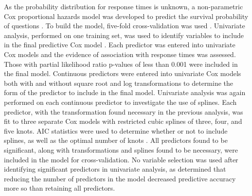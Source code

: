 \documentclass[preprint]{elsarticle}
\begin{document}
As the probability distribution for response times is unknown, a non-parametric Cox proportional hazards model was developed to predict the survival probability of questions \cite{Moore2010}. To build the model, five-fold cross-validation was used \cite{Rodriguez2010}. Univariate analysis, performed on one training set, was used to identify variables to include in the final predictive Cox model \cite{Hammermeister1979}. Each predictor was entered into univariate Cox models and the evidence of association with response times was assessed. Those with partial likelihood ratio p-values of less than 0.001 were included in the final model.  Continuous predictors were entered into univariate Cox models both with and without square root and log transformations to determine the form of the predictor to include in the final model. Univariate analysis was again performed on each continuous predictor to investigate the use of splines. Each predictor, with the transformation found necessary in the previous analysis, was fit to three separate Cox models with restricted cubic splines of three, four, and five knots. AIC statistics were used to determine whether or not to include splines, as well as the optimal number of knots \cite{Harrell2015}. All predictors found to be significant, along with transformations and splines found to be necessary, were included in the model for cross-validation. No variable selection was used after identifying significant predictors in univariate analysis, as \cite{Harrell2015} determined that reducing the number of predictors in the model decreased predictive accuracy more so than retaining all predictors. 
\end{document}
